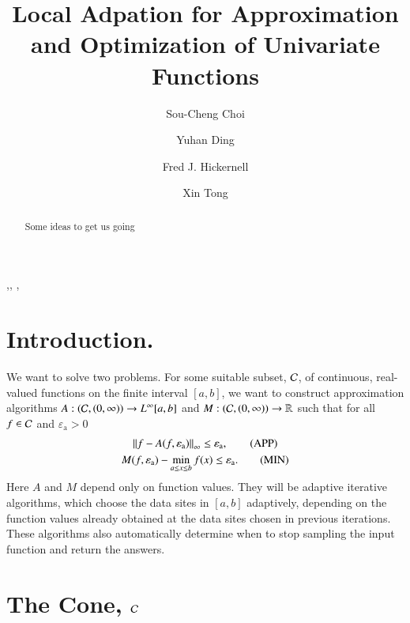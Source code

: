 \documentclass[review]{elsarticle}
\newcommand{\abstol}{\varepsilon_{\textrm{a}}}
\begin{document}
\begin{frontmatter}

\title{Local Adpation for Approximation and Optimization of Univariate Functions}


\author{Sou-Cheng Choi}
\author{Yuhan Ding}
\author{Fred J. Hickernell}
\author{Xin Tong}
\address{Department of Applied Mathematics, Illinois Institute of Technology, RE 208, 10 West 32$^{\text{nd}}$ Street, Chicago, Illinois, 60616, USA}

\begin{abstract}
Some ideas to get us going
\end{abstract}

\begin{keyword}
\sep \sep
\MSC[2010]  \sep
\end{keyword}

\end{frontmatter}

\section{Introduction.} \label{sec:intro}

We want to solve two problems. For some suitable subset, $\mathcal{C}$, of continuous,
real-valued functions on the finite interval $[a,b]$, we want to construct approximation
algorithms $A:(\mathcal{C},(0,\infty)) \to L^{\infty}[a,b]$ and $M: (\mathcal{C},(0,\infty)) \to
\mathbb{R}$ such that for all $f \in \mathcal{C}$ and $\abstol > 0$
\begin{gather}
\norm[\infty]{f - A(f,\abstol)} \le \abstol,  \tag{APP} \label{appxprob} \\
M(f,\abstol) - \min_{a \le x \le b} f(x)  \le \abstol. \tag{MIN} \label{optprob}
\end{gather}
Here $A$ and $M$ depend only on function values. They will be adaptive iterative
algorithms, which choose the data sites in $[a,b]$ adaptively, depending on the
function values already obtained at the data sites chosen in previous iterations. These
algorithms also automatically determine when to stop sampling the input function
and return the answers.

\section{The Cone, $\mathcal{C}$} \label{sec:cone}
\end{document}
